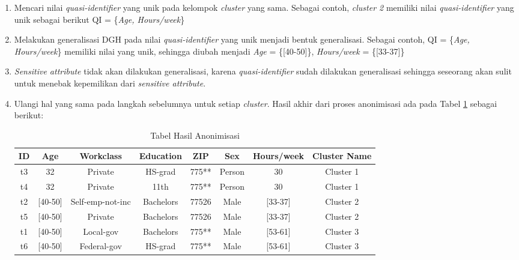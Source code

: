 \documentclass[a4paper,twoside]{article}
\begin{document}
\begin{enumerate}
\begin{enumerate}
\item Mencari nilai \textit{quasi-identifier} yang unik pada kelompok \textit{cluster} yang sama. Sebagai contoh, \textit{cluster 2} memiliki nilai \textit{quasi-identifier} yang unik sebagai berikut QI = \{\textit{Age, Hours/week}\}

\item Melakukan generalisasi DGH pada nilai \textit{quasi-identifier} yang unik menjadi bentuk generalisasi. Sebagai contoh, QI = \{\textit{Age, Hours/week}\} memiliki nilai yang unik, sehingga diubah menjadi \textit{Age} = \{[40-50]\}, \textit{Hours/week} = \{[33-37]\}

\item \textit{Sensitive attribute} tidak akan dilakukan generalisasi, karena \textit{quasi-identifier} sudah dilakukan generalisasi sehingga seseorang akan sulit untuk menebak kepemilikan dari \textit{sensitive attribute}.

\item Ulangi hal yang sama pada langkah sebelumnya untuk setiap \textit{cluster}. Hasil akhir dari proses anonimisasi ada pada Tabel \ref{table:anonimisasi} sebagai berikut: 
\begin{table}[H]
\centering
\caption{Tabel Hasil Anonimisasi}
\begin{adjustwidth}{1.7cm}{0cm}
\begin{tabular}{c c c c c c c c}
\hline 
ID & Age & Workclass & Education & ZIP & Sex & Hours/week & Cluster Name\\ 
\hline 
t3 & 32 & Private & HS-grad & 775** & Person & 30 & Cluster 1 \\ 
t4 & 32 & Private & 11th & 775** & Person & 30 & Cluster 1 \\ 
\hline 
t2 & [40-50] & Self-emp-not-inc & Bachelors & 77526 & Male & [33-37] & Cluster 2 \\ 
t5 & [40-50] & Private & Bachelors & 77526 & Male & [33-37]	& Cluster 2\\ 
\hline 
t1 & [40-50] & Local-gov & Bachelors & 775** & Male & [53-61] & Cluster 3\\ 
t6 & [40-50] & Federal-gov & HS-grad & 775** & Male & [53-61] & Cluster 3\\ 
\hline 
\end{tabular} 
\end{adjustwidth}
\label{table:anonimisasi}
\end{table}

\end{enumerate}
		


\end{enumerate}
\end{document}
